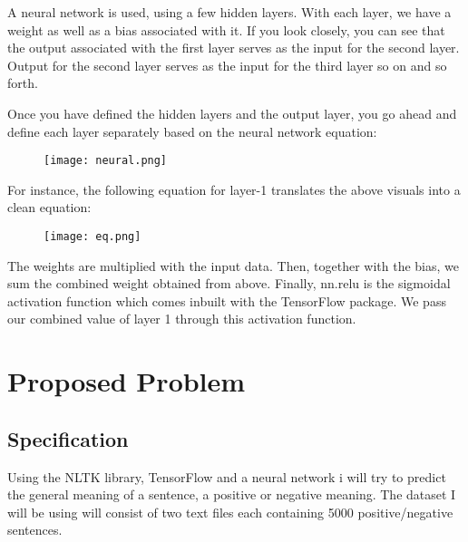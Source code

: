 \documentclass[a4paper,10pt]{report}
\begin{document}
A neural network is used, using a few hidden layers. With each layer, we have a weight as well as a bias associated with it. If you look closely, you can see that the output associated with the first layer serves as the input for the second layer. Output for the second layer serves as the input for the third layer so on and so forth.

Once you have defined the hidden layers and the output layer, you go ahead and define each layer separately based on the neural network equation:
\begin{figure}[h]
 \centering
  \texttt{[image: neural.png]}
\end{figure}

For instance, the following equation for layer-1 translates the above visuals into a clean equation:

\begin{figure}[h]
 \centering
  \texttt{[image: eq.png]}
\end{figure}
 
The weights are multiplied with the input data.
Then, together with the bias, we sum the combined weight obtained from above.
Finally, nn.relu is the sigmoidal activation function which comes inbuilt with the TensorFlow package. We pass our combined value of layer 1 through this activation function.
\section{Proposed Problem}
\subsection{Specification}
Using the NLTK library, TensorFlow and a neural network i will try to predict the general meaning of a sentence, a positive or negative meaning.
The dataset I will be using will consist of two text files each containing 5000 positive/negative sentences. 
\end{document}
